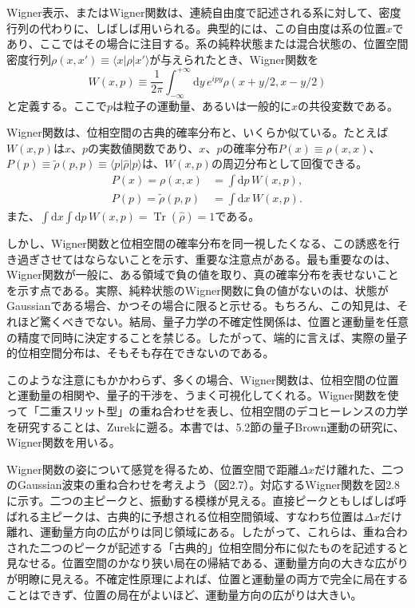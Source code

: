 

Wigner表示、またはWigner関数は、連続自由度で記述される系に対して、密度行列の代わりに、しばしば用いられる。典型的には、この自由度は系の位置$x$であり、ここではその場合に注目する。系の純粋状態または混合状態の、位置空間密度行列$\rho(x,x')\equiv\langle x\rvert\hat\rho\lvert x'\rangle$が与えられたとき、Wigner関数を\cite{ref149,ref150}
\begin{equation}W(x,p)\equiv\frac1{2\pi}\int_{-\infty}^{+\infty}\mathrm dy\,e^{ipy}\rho(x+y/2,x-y/2)\tag{2.132}\end{equation}
と定義する。ここで$p$は粒子の運動量、あるいは一般的に$x$の共役変数である。

Wigner関数は、位相空間の古典的確率分布と、いくらか似ている。たとえば$W(x,p)$は$x$、$p$の実数値関数であり、$x$、$p$の確率分布$P(x)\equiv\rho(x,x)$、$P(p)\equiv\widetilde\rho(p,p)\equiv\langle p\rvert\hat\rho\lvert p\rangle$は、$W(x,p)$の周辺分布として回復できる。
\begin{align}P(x)=\rho(x,x)&=\int\mathrm dp\,W(x,p),\tag{2.133}\\P(p)=\widetilde\rho(p,p)&=\int\mathrm dx\,W(x,p).\tag{2.134}\end{align}
また、$\int\mathrm dx\int\mathrm dp\,W(x,p)=\operatorname{Tr}(\hat\rho)=1$である。

\hypertarget{srcpage:107}{}\label{srcpage:107}
しかし、Wigner関数と位相空間の確率分布を同一視したくなる、この誘惑を行き過ぎさせてはならないことを示す、重要な注意点がある。最も重要なのは、Wigner関数が一般に、ある領域で負の値を取り、真の確率分布を表せないことを示す点である。実際、純粋状態のWigner関数に負の値がないのは、状態がGaussianである場合、かつその場合に限ると示せる\cite{ref151}。もちろん、この知見は、それほど驚くべきでない。結局、量子力学の不確定性関係は、位置と運動量を任意の精度で同時に決定することを禁じる。したがって、端的に言えば、実際の量子的位相空間分布は、そもそも存在できないのである。

このような注意にもかかわらず、多くの場合、Wigner関数は、位相空間の位置と運動量の相関や、量子的干渉を、うまく可視化してくれる。Wigner関数を使って「二重スリット型」の重ね合わせを表し、位相空間のデコヒーレンスの力学を研究することは、Zurek\cite{ref013}に遡る。本書では、5.2節の量子Brown運動の研究に、Wigner関数を用いる。

Wigner関数の姿について感覚を得るため、位置空間で距離$\Delta x$だけ離れた、二つのGaussian波束の重ね合わせを考えよう（図2.7）。対応するWigner関数を図2.8に示す。二つの主ピークと、振動する模様が見える。直接ピークともしばしば呼ばれる主ピークは、古典的に予想される位相空間領域、すなわち位置は$\Delta x$だけ離れ、運動量方向の広がりは同じ領域にある。したがって、これらは、重ね合わされた二つのピークが記述する「古典的」位相空間分布に似たものを記述すると見なせる。位置空間のかなり狭い局在の帰結である、運動量方向の大きな広がりが明瞭に見える。不確定性原理によれば、位置と運動量の両方で完全に局在することはできず、位置の局在がよいほど、運動量方向の広がりは大きい。

